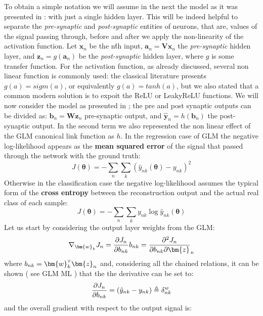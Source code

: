 To obtain a simple notation we will assume in the next the model as it was presented in \Figure{\ref{fig:mlp_a}}: with just a single hidden layer. This will be indeed helpful to separate the \textit{pre-synaptic} and \textit{post-synaptic} entities of neurons, that are, values of the signal passing through, before and after we apply the non-linearity of the activation function. Let $\bm{x}_n$ be the n\'th input, $\bm{a}_n = \bm{V}\bm{x}_n$ the \textit{pre-synaptic} hidden layer, and $\bm{z}_n = g(\bm{a}_n)$ be the \textit{post-synaptic} hidden layer, where $g$ is some transfer function. 
For the activation function, as already discussed, several non linear function is commonly used: the classical literature presents $g(a) = sigm(a)$, or equivalently $g(a) = tanh(a)$, but we also stated that a common modern solution is to expoit the ReLU or LeakyReLU functions. 
We will now consider the model as presented in \Equation{\ref{eq:mlp_a}}; the pre and post synaptic outputs can be divided as: $\bm{b}_n = \bm{W}\bm{z}_n$ pre-synaptic output, and $\hat{\bm{y}}_n = h(\bm{b}_n)$ the post-synaptic output. In the second term we also represented the non linear effect of the \acl{GLM} canonical link function as $h$.
In the regression case of \acl{GLM} the negative log-likelihood appears as the \textbf{mean squared error} of the signal that passed through the network with the ground truth:
\begin{equation}
    J(\bm{\theta}) = -\sum_n\sum_k \left(\hat{y}_{nk}(\bm{\theta}) - y_{nk}\right)^2
\end{equation}
Otherwise in the classification case the negative log-likelihood assumes the typical form of the \textbf{cross entropy} between the reconstruction output and the actual real class of each sample:
\begin{equation}
    J(\bm{\theta}) = -\sum_n\sum_k y_{nk} \log \hat{y}_{nk}(\bm{\theta})
\end{equation}
%
Let us start by considering the output layer weights from the \acl{GLM}:
\begin{equation}
    \nabla_{\bm{w}_k} J_n = \pdv{J_n}{b_{nk}} b_{nk} = \pdv{J_n}{b_{nk}} \bm{z}_n
\end{equation}
where $b_{nk} = \transpose{\bm{w}_k}\bm{z}_n$ and, considering all the chained relations, it can be shown ( see GLM ML ) that the the derivative can be set to:
\begin{equation}
    \pdv{J_n}{b_{nk}} = ( \hat{y}_{nk} - y_{nk} ) \triangleq \delta_{nk}^w
\end{equation}
and the overall gradient with respect to the output signal is:
